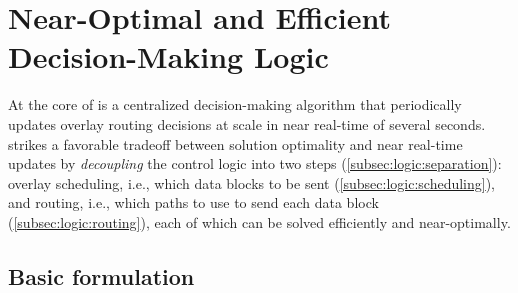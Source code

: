 \section{Near-Optimal and Efficient Decision-Making Logic}
\label{sec:logic}

At the core of \name is a centralized decision-making algorithm that
periodically updates overlay routing decisions at scale in near
real-time of several seconds. \name strikes a favorable tradeoff
between solution optimality and near real-time updates by
{\em decoupling} the control logic into two steps
(\Section\ref{subsec:logic:separation}):
overlay scheduling, i.e., which data blocks to be sent
(\Section\ref{subsec:logic:scheduling}),
and routing, i.e., which paths to use to send each data block
(\Section\ref{subsec:logic:routing}), each of which
can be solved efficiently and near-optimally.%

\subsection{Basic formulation}
\label{subsec:logic:formulation}


\begin{table}[t]
\begin{center}
\end{center}
\vspace{-0.4cm}
\label{table:para}
\end{table}

